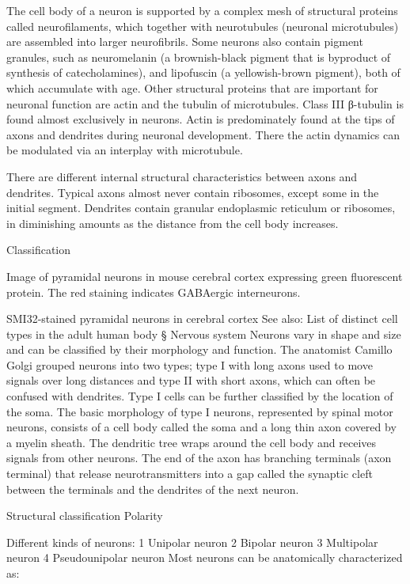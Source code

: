 The cell body of a neuron is supported by a complex mesh of structural proteins called neurofilaments, which together with neurotubules (neuronal microtubules) are assembled into larger neurofibrils. Some neurons also contain pigment granules, such as neuromelanin (a brownish-black pigment that is byproduct of synthesis of catecholamines), and lipofuscin (a yellowish-brown pigment), both of which accumulate with age. Other structural proteins that are important for neuronal function are actin and the tubulin of microtubules. Class III β-tubulin is found almost exclusively in neurons. Actin is predominately found at the tips of axons and dendrites during neuronal development. There the actin dynamics can be modulated via an interplay with microtubule.

There are different internal structural characteristics between axons and dendrites. Typical axons almost never contain ribosomes, except some in the initial segment. Dendrites contain granular endoplasmic reticulum or ribosomes, in diminishing amounts as the distance from the cell body increases.

Classification

Image of pyramidal neurons in mouse cerebral cortex expressing green fluorescent protein. The red staining indicates GABAergic interneurons.

SMI32-stained pyramidal neurons in cerebral cortex
See also: List of distinct cell types in the adult human body § Nervous system
Neurons vary in shape and size and can be classified by their morphology and function. The anatomist Camillo Golgi grouped neurons into two types; type I with long axons used to move signals over long distances and type II with short axons, which can often be confused with dendrites. Type I cells can be further classified by the location of the soma. The basic morphology of type I neurons, represented by spinal motor neurons, consists of a cell body called the soma and a long thin axon covered by a myelin sheath. The dendritic tree wraps around the cell body and receives signals from other neurons. The end of the axon has branching terminals (axon terminal) that release neurotransmitters into a gap called the synaptic cleft between the terminals and the dendrites of the next neuron.

Structural classification
Polarity

Different kinds of neurons:
1 Unipolar neuron
2 Bipolar neuron
3 Multipolar neuron
4 Pseudounipolar neuron
Most neurons can be anatomically characterized as:

